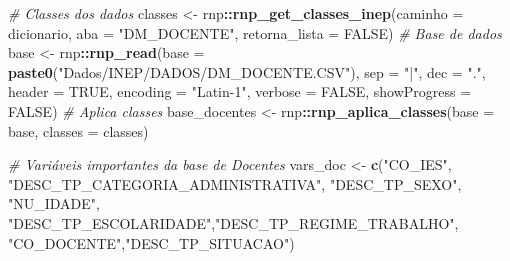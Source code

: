 \documentclass[12pt,]{style/krantz}
\makeatletter
\newenvironment{Shaded}{\begin{snugshade}}{\end{snugshade}}
\newcommand{\KeywordTok}[1]{\textcolor[rgb]{0.13,0.29,0.53}{\textbf{#1}}}
\newcommand{\DataTypeTok}[1]{\textcolor[rgb]{0.13,0.29,0.53}{#1}}
\newcommand{\StringTok}[1]{\textcolor[rgb]{0.31,0.60,0.02}{#1}}
\newcommand{\CommentTok}[1]{\textcolor[rgb]{0.56,0.35,0.01}{\textit{#1}}}
\newcommand{\OtherTok}[1]{\textcolor[rgb]{0.56,0.35,0.01}{#1}}
\newcommand{\OperatorTok}[1]{\textcolor[rgb]{0.81,0.36,0.00}{\textbf{#1}}}
\newcommand{\NormalTok}[1]{#1}
\newenvironment{kframe}{%
\medskip{}
\setlength{\fboxsep}{.8em}
 \def\at@end@of@kframe{}%
 \ifinner\ifhmode%
  \def\at@end@of@kframe{\end{minipage}}%
  \begin{minipage}{\columnwidth}%
 \fi\fi%
 \def\FrameCommand##1{\hskip\@totalleftmargin \hskip-\fboxsep
 \colorbox{shadecolor}{##1}\hskip-\fboxsep
     \hskip-\linewidth \hskip-\@totalleftmargin \hskip\columnwidth}%
 \MakeFramed {\advance\hsize-\width
   \@totalleftmargin\z@ \linewidth\hsize
   \@setminipage}}%
 {\par\unskip\endMakeFramed%
 \at@end@of@kframe}
\renewenvironment{Shaded}{\begin{kframe}}{\end{kframe}}
\theoremstyle{definition}
\theoremstyle{definition}
\theoremstyle{definition}
\theoremstyle{remark}
\makeatother
\begin{document}
\begin{Shaded}
\begin{Highlighting}[]
\CommentTok{# Classes dos dados}
\NormalTok{classes <-}\StringTok{ }\NormalTok{rnp}\OperatorTok{::}\KeywordTok{rnp_get_classes_inep}\NormalTok{(}\DataTypeTok{caminho =}\NormalTok{ dicionario, }
                                \DataTypeTok{aba =} \StringTok{"DM_DOCENTE"}\NormalTok{, }
                                \DataTypeTok{retorna_lista =} \OtherTok{FALSE}\NormalTok{)}
\CommentTok{# Base de dados  }
\NormalTok{base <-}\StringTok{ }\NormalTok{rnp}\OperatorTok{::}\KeywordTok{rnp_read}\NormalTok{(}\DataTypeTok{base =} \KeywordTok{paste0}\NormalTok{(}\StringTok{"Dados/INEP/DADOS/DM_DOCENTE.CSV"}\NormalTok{),}
                      \DataTypeTok{sep =} \StringTok{"|"}\NormalTok{, }
                      \DataTypeTok{dec =} \StringTok{"."}\NormalTok{, }
                      \DataTypeTok{header =} \OtherTok{TRUE}\NormalTok{, }
                      \DataTypeTok{encoding =} \StringTok{"Latin-1"}\NormalTok{,}
                      \DataTypeTok{verbose =} \OtherTok{FALSE}\NormalTok{, }
                      \DataTypeTok{showProgress =} \OtherTok{FALSE}\NormalTok{)}
\CommentTok{# Aplica classes}
\NormalTok{base_docentes <-}\StringTok{ }\NormalTok{rnp}\OperatorTok{::}\KeywordTok{rnp_aplica_classes}\NormalTok{(}\DataTypeTok{base =}\NormalTok{ base, }
                                         \DataTypeTok{classes =}\NormalTok{ classes)}

\CommentTok{# Variáveis importantes da base de Docentes}
\NormalTok{vars_doc <-}\StringTok{ }\KeywordTok{c}\NormalTok{(}\StringTok{"CO_IES"}\NormalTok{, }\StringTok{"DESC_TP_CATEGORIA_ADMINISTRATIVA"}\NormalTok{, }\StringTok{"DESC_TP_SEXO"}\NormalTok{,}
              \StringTok{"NU_IDADE"}\NormalTok{, }\StringTok{"DESC_TP_ESCOLARIDADE"}\NormalTok{,}\StringTok{"DESC_TP_REGIME_TRABALHO"}\NormalTok{,}
              \StringTok{"CO_DOCENTE"}\NormalTok{,}\StringTok{"DESC_TP_SITUACAO"}\NormalTok{)}


\end{Highlighting}
\end{Shaded}
\end{document}
